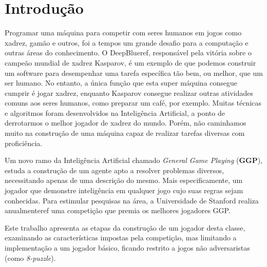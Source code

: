 \chapter{Introdução}
\label{intro}

Programar uma máquina para competir com seres humanos em jogos como xadrez, gamão e outros, foi a tempos um grande desafio para a computação e outras áreas do conhecimento. O DeepBlue{ref}, responsável pela vitória sobre o campeão mundial de xadrez Kasparov, é um exemplo de que podemos construir um software para desempenhar uma tarefa específica tão bem, ou melhor, que um ser humano. No entanto, a única função que esta super máquina consegue cumprir é jogar xadrez, enquanto Kasparov consegue realizar outras atividades comuns aos seres humanos, como preparar um café, por exemplo.
Muitas técnicas e algoritmos foram desenvolvidos na Inteligência Artificial, a ponto de derrotarmos o melhor jogador de xadrez do mundo. Porém, não caminhamos muito na construção de uma máquina capaz de realizar tarefas diversas com proficiência.

Um novo ramo da Inteligência Artificial chamado {\it General Game Playing} ({\bf GGP}), estuda a construção de um agente apto a resolver problemas diversos, necessitando apenas de uma descrição do mesmo. Mais especificamente, um jogador que demonstre inteligência em qualquer jogo cujo suas regras sejam conhecidas.
Para estimular pesquisas na área, a Universidade de Stanford realiza anualmente{ref} uma competição que premia os melhores jogadores GGP.

Este trabalho apresenta as etapas da construção de um jogador desta classe, examinando as características impostas pela competição, mas limitando a implementação a um jogador básico, ficando restrito a jogos não adversaristas (como {\it 8-puzzle}). 

